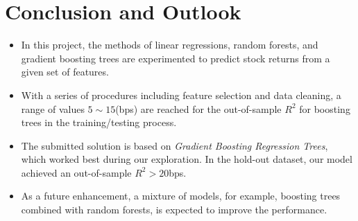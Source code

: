 \documentclass[
11pt, %
a4paper, %
oneside, %
headinclude,footinclude, %
BCOR5mm, %
]{scrartcl}
\begin{document}
\section{Conclusion and Outlook}
\begin{itemize}[noitemsep]
\item In this project, the methods of linear regressions, random forests, and gradient boosting trees are experimented to predict stock returns from a given set of features.
\item With a series of procedures including feature selection and data cleaning, a range of values $5\sim 15$(bps) are reached for the out-of-sample $R^2$ for boosting trees in the training/testing process. 
\item The submitted solution is based on \textit{Gradient Boosting Regression Trees}, which worked best during our exploration. In the hold-out dataset,  our model achieved an out-of-sample $R^2>20$bps.
\item As a future enhancement, a mixture of models, for example, boosting trees combined with random forests, is expected to improve the performance.
\end{itemize}


\renewcommand{\refname}{\spacedlowsmallcaps{References}} %




\end{document}
